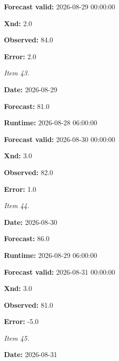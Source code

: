 \documentclass[11pt]{article}
\begin{document}
\par\noindent\textbf{Forecast valid:} 2026-08-29 00:00:00

\par\noindent\textbf{Xnd:} 2.0

\par\noindent\textbf{Observed:} 84.0

\par\noindent\textbf{Error:} 2.0

\par\noindent\textit{Item 43.}\par \par\noindent\textbf{Date:} 2026-08-29

\par\noindent\textbf{Forecast:} 81.0

\par\noindent\textbf{Runtime:} 2026-08-28 06:00:00

\par\noindent\textbf{Forecast valid:} 2026-08-30 00:00:00

\par\noindent\textbf{Xnd:} 3.0

\par\noindent\textbf{Observed:} 82.0

\par\noindent\textbf{Error:} 1.0

\par\noindent\textit{Item 44.}\par \par\noindent\textbf{Date:} 2026-08-30

\par\noindent\textbf{Forecast:} 86.0

\par\noindent\textbf{Runtime:} 2026-08-29 06:00:00

\par\noindent\textbf{Forecast valid:} 2026-08-31 00:00:00

\par\noindent\textbf{Xnd:} 3.0

\par\noindent\textbf{Observed:} 81.0

\par\noindent\textbf{Error:} -5.0

\par\noindent\textit{Item 45.}\par \par\noindent\textbf{Date:} 2026-08-31
\end{document}

